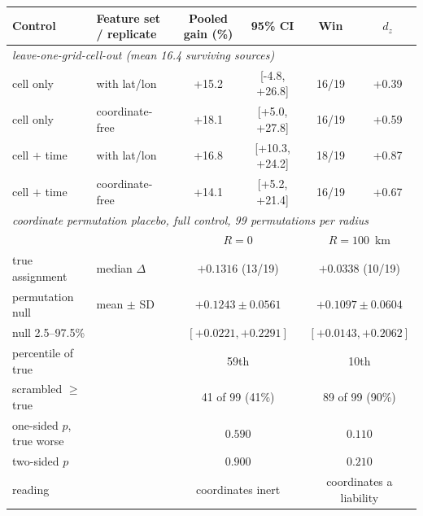 \documentclass[11pt]{article}
\begin{document}
\begin{table}[htbp]
\begin{tabular}{llcccc}
Control & Feature set / replicate & Pooled gain (\%) & 95\% CI & Win & $d_z$ \\ \midrule
\multicolumn{6}{l}{\textit{leave-one-grid-cell-out (mean 16.4 surviving sources)}} \\
cell only & with lat/lon & +15.2 & [-4.8, +26.8] & 16/19 & +0.39 \\
cell only & coordinate-free & +18.1 & [+5.0, +27.8] & 16/19 & +0.59 \\
cell $+$ time & with lat/lon & +16.8 & [+10.3, +24.2] & 18/19 & +0.87 \\
cell $+$ time & coordinate-free & +14.1 & [+5.2, +21.4] & 16/19 & +0.67 \\
\multicolumn{6}{l}{\textit{coordinate permutation placebo, full control, 99 permutations per radius}} \\
 & & \multicolumn{2}{c}{$R=0$} & \multicolumn{2}{c}{$R=100$~km} \\
true assignment & median $\Delta$ & \multicolumn{2}{c}{$+0.1316$ \; (13/19)} & \multicolumn{2}{c}{$+0.0338$ \; (10/19)} \\
permutation null & mean $\pm$ SD & \multicolumn{2}{c}{$+0.1243\pm0.0561$} & \multicolumn{2}{c}{$+0.1097\pm0.0604$} \\
\quad null 2.5--97.5\% & & \multicolumn{2}{c}{$[+0.0221,+0.2291]$} & \multicolumn{2}{c}{$[+0.0143,+0.2062]$} \\
\quad percentile of true & & \multicolumn{2}{c}{59th} & \multicolumn{2}{c}{10th} \\
\quad scrambled $\geq$ true & & \multicolumn{2}{c}{41 of 99 (41\%)} & \multicolumn{2}{c}{89 of 99 (90\%)} \\
\quad one-sided $p$, true worse & & \multicolumn{2}{c}{$0.590$} & \multicolumn{2}{c}{$0.110$} \\
\quad two-sided $p$ & & \multicolumn{2}{c}{$0.900$} & \multicolumn{2}{c}{$0.210$} \\
\quad reading & & \multicolumn{2}{c}{coordinates inert} & \multicolumn{2}{c}{coordinates a liability} \\
\bottomrule\end{tabular}\end{table}
\end{document}
